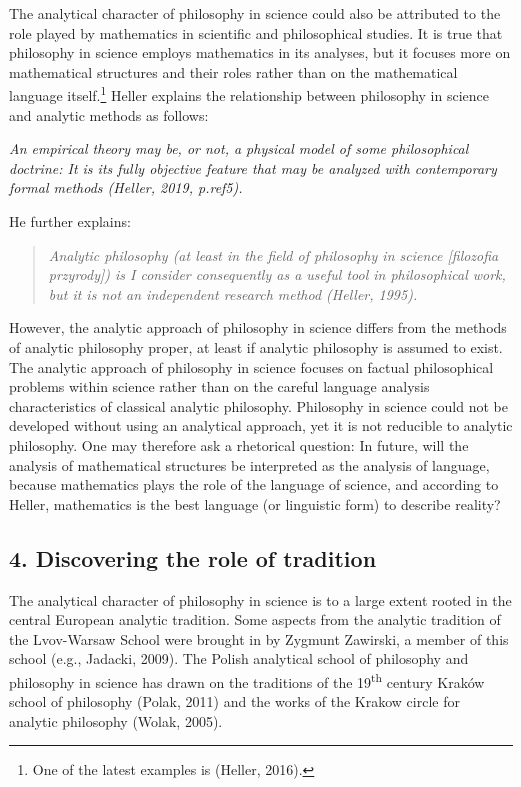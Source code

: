 \documentclass[a4paper]{article}
\newcommand\textstyleFootnoteAnchor[1]{\textsuperscript{#1}}
\begin{document}
The analytical character of philosophy in science could also be attributed to the role played by mathematics in
scientific and philosophical studies. It is true that philosophy in science employs mathematics in its analyses, but it
focuses more on mathematical structures and their roles rather than on the mathematical language itself.\footnote{One
of the latest examples is (Heller, 2016).}\textstyleFootnoteAnchor{ }Heller explains the relationship between
philosophy in science and analytic methods as follows:

{\itshape
An empirical theory may be, or not, a physical model of some philosophical doctrine: It is its fully objective feature
that may be analyzed with contemporary formal methods (Heller, 2019, p.ref5). }

He further explains:

\begin{quotation}
\textit{Analytic philosophy (at least in the field of philosophy in science [filozofia przyrody]) is I consider
consequently as a useful tool in philosophical work, but it is not an independent research method (Heller, 1995).}

\end{quotation}
However, the analytic approach of philosophy in science differs from the methods of analytic philosophy proper, at least
if analytic philosophy is assumed to exist. The analytic approach of philosophy in science focuses on factual
philosophical problems within science rather than on the careful language analysis characteristics of classical
analytic philosophy. Philosophy in science could not be developed without using an analytical approach, yet it is not
reducible to analytic philosophy. One may therefore ask a rhetorical question: In future, will the analysis of
mathematical structures be interpreted as the analysis of language, because mathematics plays the role of the language
of science, and according to Heller, mathematics is the best language (or linguistic form) to describe reality?

\subsection{4. Discovering the role of tradition}
The analytical character of philosophy in science is to a large extent rooted in the central European analytic
tradition. Some aspects from the analytic tradition of the Lvov-Warsaw School were brought in by Zygmunt Zawirski, a
member of this school (e.g., Jadacki, 2009). The Polish analytical school of philosophy and philosophy in science has
drawn on the traditions of the 19\textsuperscript{th} century Kraków school of philosophy (Polak, 2011) and the works
of the Krakow circle for analytic philosophy (Wolak, 2005). 
\end{document}

